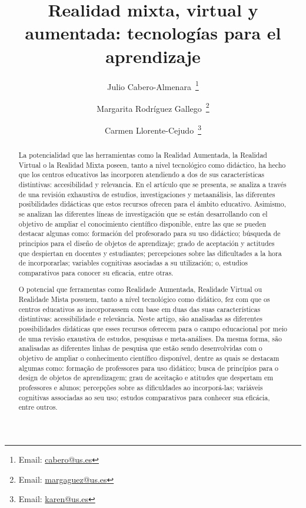 \documentclass[spanish]{textolivre}
\title{Realidad mixta, virtual y aumentada: tecnologías para el aprendizaje}
\author[1]{Julio Cabero-Almenara~\orcid{0000-0002-1133-6031}\thanks{Email: \href{mailto:cabero@us.es}{cabero@us.es}}}
\author[1]{Margarita Rodríguez Gallego~\orcid{0000-0001-6959-4829}\thanks{Email: \href{mailto:margaguez@us.es}{margaguez@us.es}}}
\author[1]{Carmen Llorente-Cejudo~\orcid{0000-0002-4281-928X}\thanks{Email: \href{mailto:karen@us.es}{karen@us.es}}}
\affil[1]{Universidad de Sevilla, Facultad de Ciencias de la Educación, Departamento de Didáctica y Organización Educativa, Sevilla, España.}
\begin{document}
\maketitle
\begin{polyabstract}
\begin{abstract}
La potencialidad que las herramientas como la Realidad Aumentada, la Realidad Virtual o la Realidad Mixta poseen, tanto a nivel tecnológico como didáctico, ha hecho que los centros educativos las incorporen atendiendo a dos de sus características distintivas: accesibilidad y relevancia. En el artículo que se presenta, se analiza a través de una revisión exhaustiva de estudios, investigaciones y metaanálisis, las diferentes posibilidades didácticas que estos recursos ofrecen para el ámbito educativo. Asimismo, se analizan las diferentes líneas de investigación que se están desarrollando con el objetivo de ampliar el conocimiento científico disponible, entre las que se pueden destacar algunas como: formación del profesorado para su uso didáctico; búsqueda de principios para el diseño de objetos de aprendizaje; grado de aceptación y actitudes que despiertan en docentes y estudiantes; percepciones sobre las dificultades a la hora de incorporarlas; variables cognitivas asociadas a su utilización; o, estudios comparativos para conocer su eficacia, entre otras.

\end{abstract}

\begin{portuguese}
\begin{abstract}
O potencial que ferramentas como Realidade Aumentada, Realidade Virtual ou Realidade Mista possuem, tanto a nível tecnológico como didático, fez com que os centros educativos as incorporassem com base em duas das suas características distintivas: acessibilidade e relevância. Neste artigo, são analisadas as diferentes possibilidades didáticas que esses recursos oferecem para o campo educacional por meio de uma revisão exaustiva de estudos, pesquisas e meta-análises. Da mesma forma, são analisadas as diferentes linhas de pesquisa que estão sendo desenvolvidas com o objetivo de ampliar o conhecimento científico disponível, dentre as quais se destacam algumas como: formação de professores para uso didático; busca de princípios para o design de objetos de aprendizagem; grau de aceitação e atitudes que despertam em professores e alunos; percepções sobre as dificuldades ao incorporá-las; variáveis cognitivas associadas ao seu uso; estudos comparativos para conhecer sua eficácia, entre outros.


\end{abstract}
\end{portuguese}
\end{polyabstract}
\end{document}

